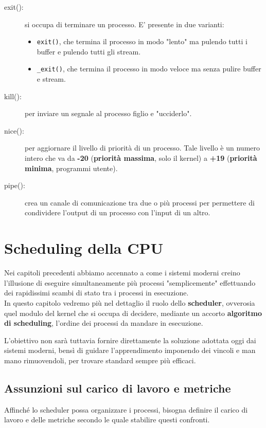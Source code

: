 \documentclass[12pt]{report}
\begin{document}
	\begin{description}
		\item [exit():] si occupa di terminare un processo. E' presente in due varianti:
		\begin{itemize}
			\item \texttt{exit()}, che termina il processo in modo "lento" ma pulendo tutti i buffer e pulendo tutti gli stream.
			
			\item \texttt{\_exit()}, che termina il processo in modo veloce ma senza pulire buffer e stream.
		\end{itemize}
		
		\item[kill():] per inviare un segnale al processo figlio e "ucciderlo".
		
		\item[nice():] per aggiornare il livello di priorità di un processo. Tale livello è un numero intero che va da \textbf{-20} (\textbf{priorità massima}, solo il kernel) a \textbf{+19} (\textbf{priorità minima}, programmi utente).
		
		\item[pipe():] crea un canale di comunicazione tra due o più processi per permettere di condividere l'output di un processo con l'input di un altro. 
	\end{description}
	
	\chapter{Scheduling della CPU}
	Nei capitoli precedenti abbiamo accennato a come i sistemi moderni creino l'illusione di eseguire simultaneamente più processi "semplicemente" effettuando dei rapidissimi scambi di stato tra i processi in esecuzione.\\
	In questo capitolo vedremo più nel dettaglio il ruolo dello \textbf{scheduler}, ovverosia quel modulo del kernel che si occupa di decidere, mediante un accorto \textbf{algoritmo di scheduling}, l'ordine dei processi da mandare in esecuzione.
	\smallbreak
	
	L'obiettivo non sarà tuttavia fornire direttamente la soluzione adottata oggi dai sistemi moderni, bensì di guidare l'apprendimento imponendo dei vincoli e man mano rimuovendoli, per trovare standard sempre più efficaci.
	
	\section{Assunzioni sul carico di lavoro e metriche}
	Affinché lo scheduler possa organizzare i processi, bisogna definire il carico di lavoro e delle metriche secondo le quale stabilire questi confronti.
	
\end{document}
